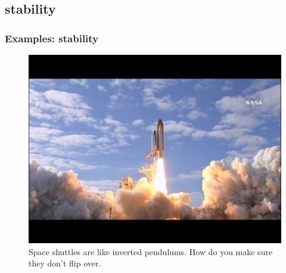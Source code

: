 \subsection[stability]{stability}
\begin{frame}
	\frametitle{Examples: stability}
\begin{figure}
\centering
\includegraphics[width=0.7\linewidth]{shuttle}
\caption{Space shuttles are like inverted pendulums. How do you make sure they don't flip over.}
\label{fig:shuttle}
\end{figure}
\end{frame}


